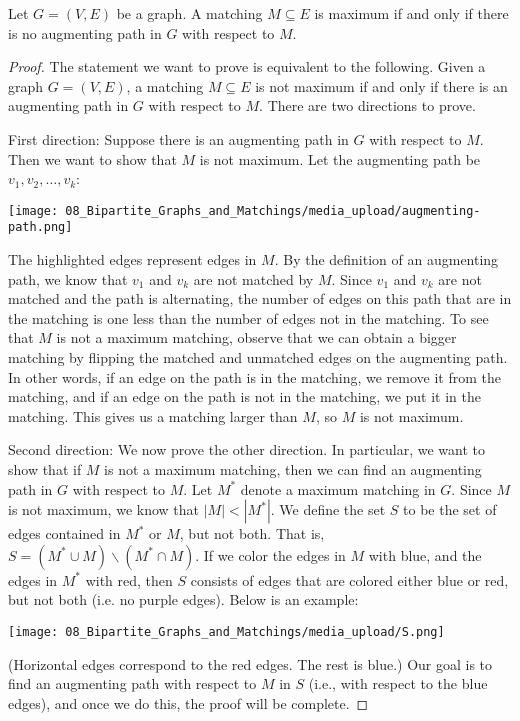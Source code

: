 \begin{flex}
\begin{theorem} \label{theorem:Characterization-for-maximum-matchings}
Let $G=(V,E)$ be a graph. A matching $M \subseteq E$ is maximum if and only if there is no augmenting path in $G$ with respect to $M$.
\end{theorem}

\begin{proof}
The statement we want to prove is equivalent to the following. Given a graph $G = (V,E)$, a matching $M \subseteq E$ is not maximum if and only if there is an augmenting path in $G$ with respect to $M$. There are two directions to prove.

\noindent
First direction: Suppose there is an augmenting path in $G$ with respect to $M$. Then we want to show that $M$ is not maximum. Let the augmenting path be $v_1,v_2,\ldots,v_k$:
\begin{center}
    \texttt{[image: 08\_Bipartite\_Graphs\_and\_Matchings/media\_upload/augmenting-path.png]}
\end{center}
The highlighted edges represent edges in $M$. By the definition of an augmenting path, we know that $v_1$ and $v_k$ are not matched by $M$. Since $v_1$ and $v_k$ are not matched and the path is alternating, the number of edges on this path that are in the matching is one less than the number of edges not in the matching. To see that $M$ is not a maximum matching, observe that we can obtain a bigger matching by flipping the matched and unmatched edges on the augmenting path. In other words, if an edge on the path is in the matching, we remove it from the matching, and if an edge on the path is not in the matching, we put it in the matching. This gives us a matching larger than $M$, so $M$ is not maximum.

\noindent
Second direction: We now prove the other direction. In particular, we want to show that if $M$ is not a maximum matching, then we can find an augmenting path in $G$ with respect to $M$. Let $M^*$ denote a maximum matching in $G$. Since $M$ is not maximum, we know that $|M| < |M^*|$. We define the set $S$ to be the set of edges contained in $M^*$ or $M$, but not both. That is, $S =  (M^* \cup M) \backslash (M^* \cap M)$. If we color the edges in $M$ with blue, and the edges in $M^*$ with red, then $S$ consists of edges that are colored either blue or red, but not both (i.e. no purple edges). Below is an example:
\begin{center}
    \texttt{[image: 08\_Bipartite\_Graphs\_and\_Matchings/media\_upload/S.png]}
\end{center}
(Horizontal edges correspond to the red edges. The rest is blue.) Our goal is to find an augmenting path with respect to $M$ in $S$ (i.e., with respect to the blue edges), and once we do this, the proof will be complete. 


\end{proof}
\end{flex}
